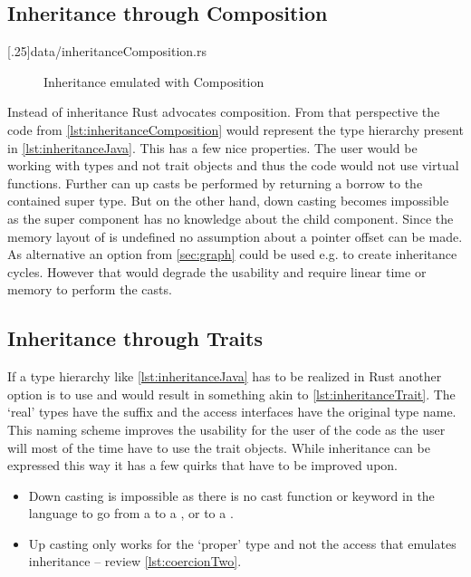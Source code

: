 \documentclass[thesis]{subfiles}
\begin{document}
  \subsection{Inheritance through Composition}%
    \LstTikzBox{\inheritanceComposition}[.25\linewidth]{data/inheritanceComposition.rs}
    \begin{wrapfigure}{r}{0.38\textwidth}%
      \vspace*{-\baselineskip}%
      \captionsetup{type=lstlisting}%
      \begin{center}%
        \usebox{\inheritanceComposition}%
      \end{center}%
      \vspace*{-\baselineskip}%
      \caption{Inheritance emulated with Composition}\label{lst:inheritanceComposition}%
    \end{wrapfigure}%
    Instead of inheritance Rust advocates composition.
    From that perspective the code from \autoref{lst:inheritanceComposition} would represent the type hierarchy present in \autoref{lst:inheritanceJava}.
    This has a few nice properties.
    The user would be working with types and not trait objects and thus the code would not use virtual functions.
    Further can up casts be performed by returning a borrow to the contained super type.
    But on the other hand, down casting becomes impossible as the super component has no knowledge about the child component.
    Since the memory layout of \structs is undefined\autocite[0079-undefined-struct-layout]{rust-rfc} no assumption about a pointer offset can be made.
    As alternative an option from \autoref{sec:graph} could be used e.g.  to create inheritance cycles.
    However that would degrade the usability and require linear time or memory to perform the casts.

  \subsection{Inheritance through Traits}\label{sec:magic}
    If a type hierarchy like \autoref{lst:inheritanceJava} has to be realized in Rust another option is to use \traits and would result in something akin to \autoref{lst:inheritanceTrait}.
    The `real' types have the suffix  and the access interfaces have the original type name.
    This naming scheme improves the usability for the user of the code as the user will most of the time have to use the trait objects.
    While inheritance can be expressed this way it has a few quirks that have to be improved upon.
    \begin{itemize}
      \item Down casting is impossible as there is no cast function or keyword in the language to go from a \trait to a \struct, or to a \trait.
      \item Up casting only works for the `proper' type and not the access \trait that emulates inheritance -- review \autoref{lst:coercionTwo}.
    \end{itemize}
\end{document}
